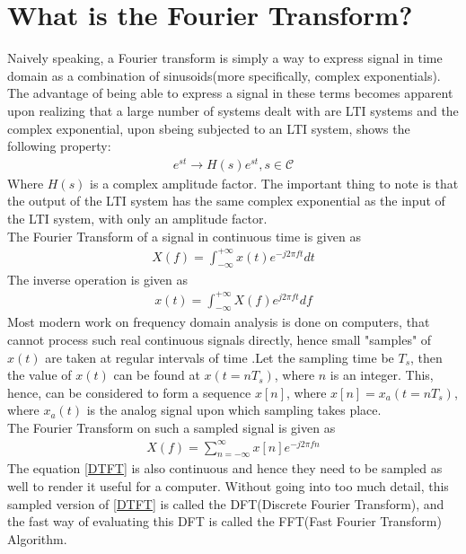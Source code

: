 \documentclass[oneside]{book}
\begin{document}
\chapter{What is the Fourier Transform?}
Naively speaking, a Fourier transform is simply a way to express signal in time domain as a combination of sinusoids(more specifically, complex exponentials). The advantage of being able to express a signal in these terms becomes apparent upon realizing that a large number of systems dealt with are LTI systems and the complex exponential, upon sbeing subjected to an LTI system, shows the following property:
\begin{align}
    e^{st} \rightarrow H(s)e^{st}, s \in \mathcal{C}
\end{align}
Where $H(s)$ is a complex amplitude factor. The important thing to note is that the output of the LTI system has the same complex exponential as the input of the LTI system, with only an amplitude factor.\\
The Fourier Transform of a signal in continuous time is given as 
\begin{align}
    X(f) = \int_{-\infty}^{+\infty} x(t)e^{-j2\pi f t} dt \label{CTFT}
\end{align}
The inverse operation is given as
\begin{align}
    x(t) = \int_{-\infty}^{+\infty}X(f)e^{j2\pi ft}df \label{Inverse_CTFT}
\end{align}
Most modern work on frequency domain analysis is done on computers, that cannot process such real continuous signals directly, hence small "samples" of $x(t)$ are taken at regular intervals of time .Let the sampling time be $T_s$, then the value of $x(t)$ can be found at $x(t = nT_s)$, where $n$ is an integer. This, hence, can be considered to form a sequence $x[n]$, where $x[n] = x_a(t = nT_s)$, where $x_a(t)$ is the analog signal upon which sampling takes place. \\
\bigskip
The Fourier Transform on such a sampled signal is given as
\begin{align}
    X(f) = \sum_{n = -\infty}^{\infty} x[n] e^{-j2\pi f n} \label{DTFT}
\end{align}
The equation \eqref{DTFT} is also continuous and hence they need to be sampled as well to render it useful for a computer. Without going into too much detail, this sampled version of \eqref{DTFT} is called the DFT(Discrete Fourier Transform), and the fast way of evaluating this DFT is called the FFT(Fast Fourier Transform) Algorithm.
\end{document}
